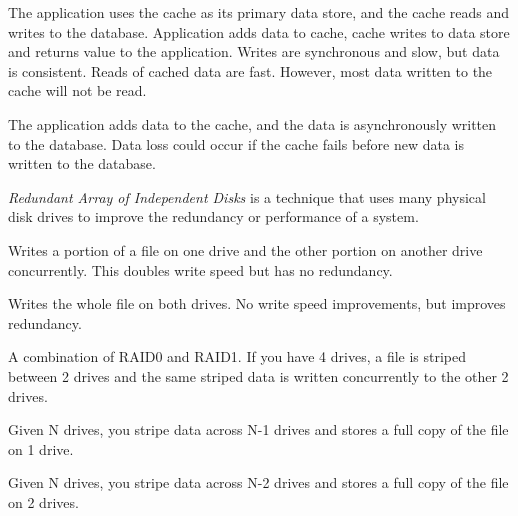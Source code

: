 \begin{description}
\begin{description}[7mm]
\begin{description}[7mm]
			\item[Write-through] The application uses the cache as its primary data store, and the cache reads and writes to the database. Application adds data to cache, cache writes to data store and returns value to the application. Writes are synchronous and slow, but data is consistent. Reads of cached data are fast. However, most data written to the cache will not be read.
			\item[Write-back] The application adds data to the cache, and the data is asynchronously written to the database. Data loss could occur if the cache fails before new data is written to the database.
		\end{description}
	\end{description}
	
	\item[RAID] \textit{Redundant Array of Independent Disks} is a technique that uses many physical disk drives to improve the redundancy or performance of a system.
	\begin{description}[7mm]
		\item[RAID0] Writes a portion of a file on one drive and the other portion on another drive concurrently. This doubles write speed but has no redundancy.
		\item[RAID1] Writes the whole file on both drives. No write speed improvements, but improves redundancy.
		\item[RAID10] A combination of RAID0 and RAID1. If you have 4 drives, a file is striped between 2 drives and the same striped data is written concurrently to the other 2 drives.
		\item[RAID5] Given N drives, you stripe data across N-1 drives and stores a full copy of the file on 1 drive.
		\item[RAID6] Given N drives, you stripe data across N-2 drives and stores a full copy of the file on 2 drives.
	\end{description}


\end{description}
